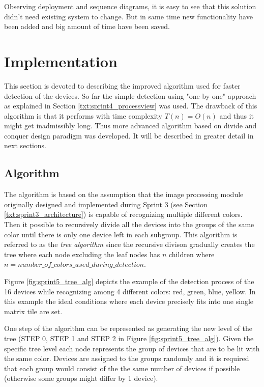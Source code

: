 Observing deployment and sequence diagrams, it is easy to see that this solution didn't need existing system to change. But in same time new functionality have been added and big amount of time have been saved.

\section{Implementation} \label{txt:sprint5_immplementation}
This section is devoted to describing the improved algorithm used for faster detection of the devices. So far the simple detection using "one-by-one" approach as explained in Section \ref{txt:sprint4_processview} was used. The drawback of this algorithm is that it performs with time complexity $T(n) = O(n)$ and thus it might get inadmissibly long. Thus more advanced algorithm based on divide and conquer design paradigm was developed. It will be described in greater detail in next sections.

\subsection{Algorithm} \label{subsec:tree_alg}
The algorithm is based on the assumption that the image processing module originally designed and implemented during Sprint 3 (see Section \ref{txt:sprint3_architecture}) is capable of recognizing multiple different colors. Then it possible to recursively divide all the devices into the groups of the same color until there is only one device left in each subgroup. This algorithm is referred to as the \textit{tree algorithm} since the recursive divison gradually creates the tree where each node excluding the leaf nodes has $n$ children where $n = number\_of\_colors\_used\_during\_detection$.

Figure \ref{fig:sprint5_tree_alg} depicts the example of the detection process of the 16 devices while recognizing among 4 different colors: red, green, blue, yellow. In this example the ideal conditions where each device precisely fits into one single matrix tile are set. 

One step of the algorithm can be represented as generating the new level of the tree (STEP 0, STEP 1 and STEP 2 in Figure \ref{fig:sprint5_tree_alg}). Given the specific tree level each node represents the group of devices that are to be lit with the same color. Devices are assigned to the groups randomly and it is required that each group would consist of the the same number of devices if possible (otherwise some groups might differ by 1 device).

